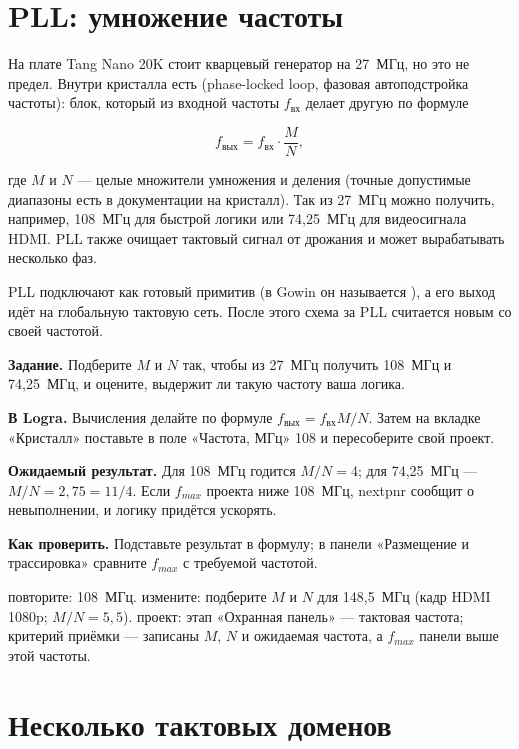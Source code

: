 \section{PLL: умножение частоты}

На плате Tang Nano 20K стоит кварцевый генератор на 27~МГц, но
это не предел. Внутри кристалла есть  (phase-locked loop,
фазовая автоподстройка частоты): блок, который из входной частоты
$f_{\text{вх}}$ делает другую по формуле

\[
f_{\text{вых}} = f_{\text{вх}}\cdot\frac{M}{N},
\]

где $M$ и $N$ --- целые множители умножения и деления (точные
допустимые диапазоны есть в документации на кристалл). Так из 27~МГц можно
получить, например, 108~МГц для быстрой логики или 74{,}25~МГц для
видеосигнала HDMI. PLL также очищает тактовый сигнал от дрожания и может
вырабатывать несколько фаз.

PLL подключают как готовый примитив (в Gowin он называется ), а
его выход идёт на глобальную тактовую сеть. После этого схема за PLL
считается новым  со своей частотой.

\begin{diybox}
\textbf{Задание.} Подберите $M$ и $N$ так, чтобы из 27~МГц получить 108~МГц и 74,25~МГц, и оцените, выдержит ли такую частоту ваша логика.

\textbf{В Logra.} Вычисления делайте по формуле $f_{\text{вых}}=f_{\text{вх}}M/N$. Затем на вкладке «Кристалл» поставьте в поле «Частота, МГц» 108 и пересоберите свой проект.

\textbf{Ожидаемый результат.} Для 108~МГц годится $M/N=4$; для 74,25~МГц --- $M/N=2{,}75=11/4$. Если $f_{max}$ проекта ниже 108~МГц, nextpnr сообщит о невыполнении, и логику придётся ускорять.

\textbf{Как проверить.} Подставьте результат в формулу; в панели «Размещение и трассировка» сравните $f_{max}$ с требуемой частотой.

 повторите: 108~МГц.  измените: подберите $M$ и $N$ для 148,5~МГц (кадр HDMI 1080p; $M/N=5{,}5$).  проект: этап «Охранная панель» --- тактовая частота; критерий приёмки --- записаны $M$, $N$ и ожидаемая частота, а $f_{max}$ панели выше этой частоты.
\end{diybox}

\section{Несколько тактовых доменов}

